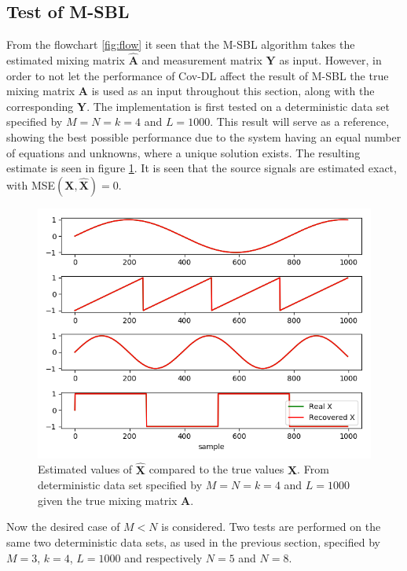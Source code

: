 \subsection{Test of M-SBL}
From the flowchart \ref{fig:flow} it seen that the M-SBL algorithm takes the estimated mixing matrix $\hat{\mathbf{A}}$ and measurement matrix $\mathbf{Y}$ as input. However, in order to not let the performance of Cov-DL affect the result of M-SBL the true mixing matrix $\mathbf{A}$ is used as an input throughout this section, along with the corresponding $\mathbf{Y}$. 
The implementation is first tested on a deterministic data set specified by $M = N = k = 4$ and $L=1000$. 
This result will serve as a reference, showing the best possible performance due to the system having an equal number of equations and unknowns, where a unique solution exists.
The resulting estimate is seen in figure \ref{fig:M-SBL_simple0}. 
It is seen that the source signals are estimated exact, with MSE$(\mathbf{X}, \hat{\mathbf{X}}) = 0$. 
\begin{figure}[H]
\centering
\includegraphics[scale=0.5]{figures/ch_6/M-SBL_simple0.png}
\caption{Estimated values of $\hat{\mathbf{X}}$ compared to the true values $\mathbf{X}$. From deterministic data set specified by $M = N = k = 4$ and $L=1000$ given the true mixing matrix $\mathbf{A}$.}
\label{fig:M-SBL_simple0}
\end{figure}
\noindent
Now the desired case of $M < N$ is considered. 
Two tests are performed on the same two deterministic data sets, as used in the previous section, specified by $M = 3$, $k = 4$, $L=1000$ and respectively $N = 5$ and $N = 8$.

